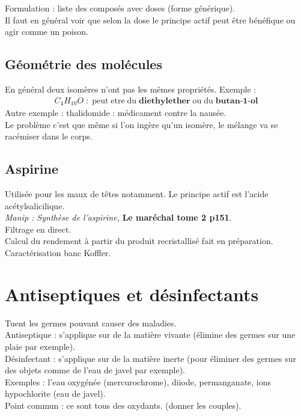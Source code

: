 \documentclass[12pt,prb,aps,epsf]{article}
\begin{document}
Formulation : liste des composés avec doses (forme générique).\\

Il faut en général voir que selon la dose le principe actif peut être bénéfique ou agir comme un poison.

\subsection{Géométrie des molécules}
En général deux isomères n'ont pas les mêmes propriétés. Exemple :
\begin{eqnarray}
C_4H_{10}O \;:\; \mathrm{peut\;etre\;du\;}\textbf{diethylether}\; \mathrm{ou \;du\;}\textbf{butan-1-ol}
\end{eqnarray}
Autre exemple : thalidomide : médicament contre la nausée.\\

Le problème c'est que même si l'on ingère qu'un isomère, le mélange va se racémiser dans le corps.

\subsection{Aspirine}
Utilisée pour les maux de têtes notamment. Le principe actif est l'acide acétylsalicilique. \\
\textit{Manip : Synthèse de l'aspirine, }\textbf{Le maréchal tome 2 p151}.\\
Filtrage en direct.\\
Calcul du rendement à partir du produit recristallisé fait en préparation.\\
Caractérisation banc Koffler.

\section{Antiseptiques et désinfectants}
Tuent les germes pouvant causer des maladies.\\
Antiseptique : s'applique sur de la matière vivante (élimine des germes sur une plaie par exemple).\\
Désinfectant : s'applique sur de la matière inerte (pour éliminer des germes sur des objets comme de l'eau de javel par exemple).\\

Exemples : l'eau oxygénée (mercurochrome), diiode, permanganate, ions hypochlorite (eau de javel).\\
Point commun : ce sont tous des oxydants. (donner les couples).\\
\end{document}

